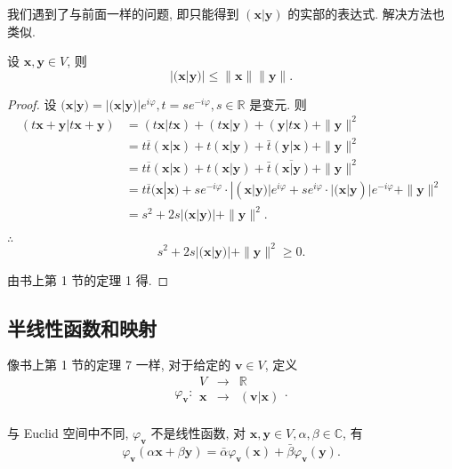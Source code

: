 \documentclass[color=black,device=normal,lang=cn,mode=geye]{elegantnote}
\begin{document}
我们遇到了与前面一样的问题, 即只能得到 $(\boldsymbol{x}|\boldsymbol{y})$ 的实部的表达式. 解决方法也类似.
\begin{theorem}
    设 $\boldsymbol{x},\boldsymbol{y}\in V$, 则
    \[|(\boldsymbol{x}|\boldsymbol{y})|\leq\|\boldsymbol{x}\|\|\boldsymbol{y}\|.\]
\end{theorem}
\begin{proof}
    设 $(\boldsymbol{x}|\boldsymbol{y})=|(\boldsymbol{x}|\boldsymbol{y})|e^{i\varphi},t=se^{-i\varphi},s\in\mathbb{R}$ 是变元. 则 
    \begin{align*}
        (t\boldsymbol{x}+\boldsymbol{y}|t\boldsymbol{x}+\boldsymbol{y}) & =(t\boldsymbol{x}|t\boldsymbol{x})+(t\boldsymbol{x}|\boldsymbol{y})+(\boldsymbol{y}|t\boldsymbol{x})+\|\boldsymbol{y}\|^2 \\
        & =t\overline{t}(\boldsymbol{x}|\boldsymbol{x})+t(\boldsymbol{x}|\boldsymbol{y})+\bar{t}(\boldsymbol{y}|\boldsymbol{x})+\|\boldsymbol{y}\|^2 \\
        & =t\overline{t}(\boldsymbol{x}|\boldsymbol{x})+t(\boldsymbol{x}|\boldsymbol{y})+\bar{t}\overline{(\boldsymbol{x}|\boldsymbol{y})}+\|\boldsymbol{y}\|^2 \\
        & =t\overline{t}(\boldsymbol{x}|\boldsymbol{x})+se^{-i\varphi}\cdot|(\boldsymbol{x}|\boldsymbol{y})|e^{i\varphi}+se^{i\varphi}\cdot|(\boldsymbol{x}|\boldsymbol{y})|e^{-i\varphi}+\|\boldsymbol{y}\|^2 \\
        & =s^2+2s|(\boldsymbol{x}|\boldsymbol{y})|+\|\boldsymbol{y}\|^2.
    \end{align*}

    $\therefore$
    \[s^2+2s|(\boldsymbol{x}|\boldsymbol{y})|+\|\boldsymbol{y}\|^2\geq0.\]

    由书上第 1 节的定理 1 得.
\end{proof}
\subsection{半线性函数和映射}
像书上第 1 节的定理 7 一样, 对于给定的 $\boldsymbol{v}\in V$, 定义
\[\varphi_{\boldsymbol{v}}:\begin{array}{rcl}
    V & \to & \mathbb{R} \\
    \boldsymbol{x} & \to & (\boldsymbol{v}|\boldsymbol{x}) \\
\end{array}.\]

与 Euclid 空间中不同, $\varphi_{\boldsymbol{v}}$ 不是线性函数, 对 $\boldsymbol{x},\boldsymbol{y}\in V,\alpha,\beta\in\mathbb{C}$, 有
\[\varphi_{\boldsymbol{v}}(\alpha\boldsymbol{x}+\beta\boldsymbol{y})=\bar{\alpha}\varphi_{\boldsymbol{v}}(\boldsymbol{x})+\bar{\beta}\varphi_{\boldsymbol{v}}(\boldsymbol{y}).\]
\end{document}
